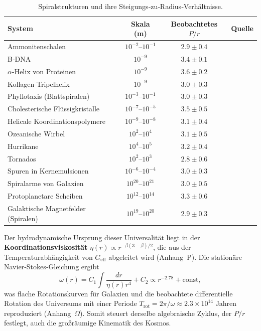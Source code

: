 \documentclass[12pt]{article}
\begin{document}
	\begin{table}[H]
		\centering
		\caption{Spiralstrukturen und ihre Steigungs‐zu‐Radius‐Verhältnisse.}
		\label{tab:spiral-examples}
		\small
		\begin{tabular}{@{}l c c c@{}}
			\toprule
			\textbf{System} & \textbf{Skala (m)} & \textbf{Beobachtetes \(P/r\)} & \textbf{Quelle} \\
			\midrule
			Ammonitenschalen & \(10^{-2}\)--\(10^{-1}\) & \(2.9 \pm 0.4\) & \cite{ammonites} \\
			B‑DNA & \(10^{-9}\) & \(3.4 \pm 0.1\) & \cite{watsoncrick} \\
			\(\alpha\)-Helix von Proteinen & \(10^{-9}\) & \(3.6 \pm 0.2\) & \cite{pauling} \\
			Kollagen‑Tripelhelix & \(10^{-9}\) & \(3.0 \pm 0.3\) & \cite{collagen} \\
			Phyllotaxis (Blattspiralen) & \(10^{-3}\)--\(10^{-1}\) & \(3.0 \pm 0.3\) & \cite{phyllotaxis} \\
			Cholesterische Flüssigkristalle & \(10^{-7}\)--\(10^{-5}\) & \(3.5 \pm 0.5\) & \cite{cholesteric} \\
			Helicale Koordinationspolymere & \(10^{-9}\)--\(10^{-8}\) & \(3.1 \pm 0.4\) & \cite{helical-mof} \\
			Ozeanische Wirbel & \(10^{2}\)--\(10^{4}\) & \(3.1 \pm 0.5\) & \cite{ocean-eddies} \\
			Hurrikane & \(10^{4}\)--\(10^{5}\) & \(3.2 \pm 0.4\) & \cite{hurricanes} \\
			Tornados & \(10^{2}\)--\(10^{3}\) & \(2.8 \pm 0.6\) & \cite{tornadoes} \\
			Spuren in Kernemulsionen & \(10^{-6}\)--\(10^{-4}\) & \(3.0 \pm 0.3\) & \cite{nuclear-tracks} \\
			Spiralarme von Galaxien & \(10^{20}\)--\(10^{21}\) & \(3.0 \pm 0.5\) & \cite{binney-tremaine} \\
			Protoplanetare Scheiben & \(10^{12}\)--\(10^{14}\) & \(3.3 \pm 0.6\) & \cite{ppdisk} \\
			Galaktische Magnetfelder (Spiralen) & \(10^{19}\)--\(10^{20}\) & \(2.9 \pm 0.3\) & \cite{beck} \\
			\bottomrule
		\end{tabular}
	\end{table}
	
	Der hydrodynamische Ursprung dieser Universalität liegt in der \textbf{Koordinationsviskosität} \(\eta(r) \propto r^{-\beta(3-\beta)/2}\), die aus der Temperaturabhängigkeit von \(G_{\mathrm{eff}}\) abgeleitet wird (Anhang~P). Die stationäre Navier‑Stokes‑Gleichung ergibt
	\[
	\omega(r) = C_1 \int \frac{dr}{\eta(r) r^4} + C_2 \propto r^{-2.78} + \text{const},
	\]
	was flache Rotationskurven für Galaxien und die beobachtete differentielle Rotation des Universums mit einer Periode \(T_{\mathrm{rot}} = 2\pi/\omega \approx 2.3\times10^{14}\) Jahren reproduziert (Anhang~\(\Omega\)). Somit steuert derselbe algebraische Zyklus, der \(P/r\) festlegt, auch die großräumige Kinematik des Kosmos.
	
\end{document}
